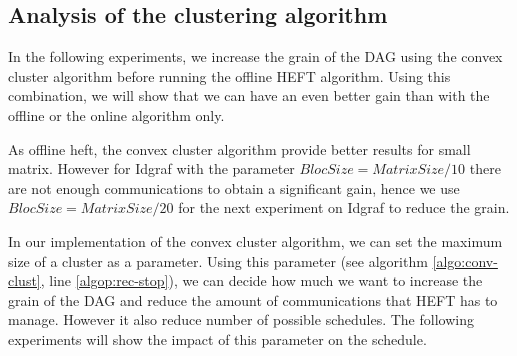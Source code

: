 \documentclass[10pt, conference, compsocconf,pdftex,dvipsnames]{IEEEtran}
\begin{document}
%            
%            
%


\subsection{Analysis of the clustering algorithm}
\label{sec:exp-exp-clust}

In the following experiments, we increase the grain of the DAG using the
convex cluster algorithm before running the offline HEFT algorithm. Using this
combination, we will show that we can have an even better gain than with the
offline or the online algorithm only.


As offline heft, the convex cluster algorithm provide better results for small
matrix. However for Idgraf with the parameter $BlocSize=MatrixSize/10$ there
are not enough communications to obtain a significant gain, hence we use
$BlocSize=MatrixSize/20$ for the next experiment on Idgraf to reduce the
grain. 

In our implementation of the convex cluster algorithm, we can set the maximum
size of a cluster as a parameter. Using this parameter (see algorithm
\ref{algo:conv-clust}, line \ref{algop:rec-stop}), we can decide how much we
want to increase the grain of the DAG and reduce the amount of communications
that HEFT has to manage.  However it also reduce number of possible schedules.
The following  experiments will show the impact of this parameter on the
schedule.
\end{document}
